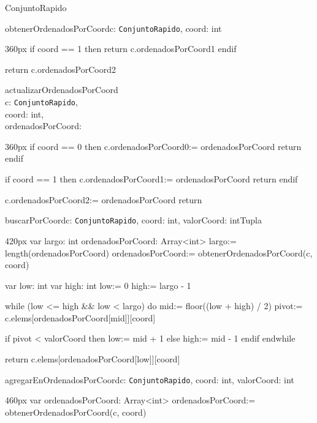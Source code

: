 \documentclass[10pt,a4paper]{article}
\begin{document}
\begin{ModuloImplements}{ConjuntoRapido}{{}}
\begin{proc}{obtenerOrdenadosPorCoord}{\In c: \texttt{ConjuntoRapido}, coord: int}{}
\begin{ImplementationCode}{360px}
      if coord == 1 then
        return c.ordenadosPorCoord1
      endif

      return c.ordenadosPorCoord2
    \end{ImplementationCode}
  \end{proc}
  \begin{proc}{actualizarOrdenadosPorCoord}{
    \\\Indent \Inout c: \texttt{ConjuntoRapido},
    \\\Indent coord: int,
    \\\Indent ordenadosPorCoord: 
  \\}{}
    \begin{ImplementationCode}{360px}
      if coord == 0 then
        c.ordenadosPorCoord0:= ordenadosPorCoord
        return
      endif

      if coord == 1 then
        c.ordenadosPorCoord1:= ordenadosPorCoord
        return
      endif

      c.ordenadosPorCoord2:= ordenadosPorCoord
      return
    \end{ImplementationCode}
  \end{proc}
  \begin{proc}{buscarPorCoord}{\In c: \texttt{ConjuntoRapido}, \In coord: int, \In valorCoord: int}{Tupla}
    \begin{ImplementationCode}{420px}
      var largo: int
          ordenadosPorCoord: Array<int>
          largo:= length(ordenadosPorCoord)
          ordenadosPorCoord:= obtenerOrdenadosPorCoord(c, coord)

      var low: int
      var high: int
          low:= 0
          high:= largo - 1
  
      while (low <= high && low < largo) do
          mid:= floor((low + high) / 2)
          pivot:= c.elems[ordenadosPorCoord[mid]][coord]
  
          if pivot < valorCoord then
              low:= mid + 1
          else
              high:= mid - 1
          endif
      endwhile
  
      return c.elems[ordenadosPorCoord[low]][coord]
    \end{ImplementationCode}
  \end{proc}
  \newpage
  \begin{proc}{agregarEnOrdenadosPorCoord}{\Inout c: \texttt{ConjuntoRapido}, \In coord: int, \In valorCoord: int}{}
    \begin{ImplementationCode}{460px}
      var ordenadosPorCoord: Array<int>
          ordenadosPorCoord:= obtenerOrdenadosPorCoord(c, coord)


\end{ImplementationCode}
\end{proc}
\end{ModuloImplements}
\end{document}
